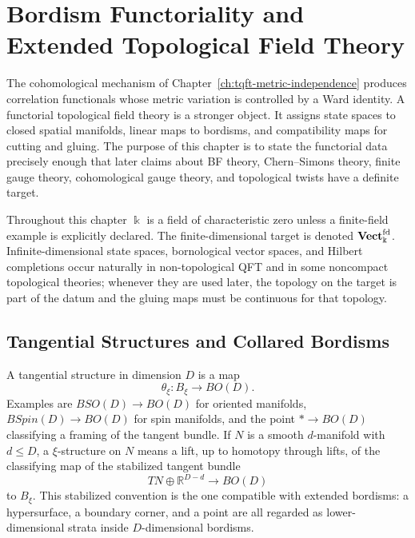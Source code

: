 \chapter{Bordism Functoriality and Extended Topological Field Theory}
\label{ch:tqft-bordism-functoriality-extended}

\ConventionsEuclidean

The cohomological mechanism of
Chapter~\ref{ch:tqft-metric-independence} produces correlation functionals
whose metric variation is controlled by a Ward identity.  A functorial
topological field theory is a stronger object.  It assigns state spaces to
closed spatial manifolds, linear maps to bordisms, and compatibility maps for
cutting and gluing.  The purpose of this chapter is to state the functorial
data precisely enough that later claims about BF theory, Chern--Simons
theory, finite gauge theory, cohomological gauge theory, and topological
twists have a definite target.

Throughout this chapter \(\Bbbk\) is a field of characteristic zero unless a
finite-field example is explicitly declared.  The finite-dimensional target
is denoted \({\bf Vect}^{\rm fd}_{\Bbbk}\).  Infinite-dimensional state
spaces, bornological vector spaces, and Hilbert completions occur naturally in
non-topological QFT and in some noncompact topological theories; whenever
they are used later, the topology on the target is part of the datum and the
gluing maps must be continuous for that topology.

\section{Tangential Structures and Collared Bordisms}

A tangential structure in dimension \(D\) is a map
\[
  \theta_\xi:B_\xi\longrightarrow BO(D).
\]
Examples are \(BSO(D)\to BO(D)\) for oriented manifolds,
\(BSpin(D)\to BO(D)\) for spin manifolds, and the point
\(\ast\to BO(D)\) classifying a framing of the tangent bundle.  If \(N\) is a
smooth \(d\)-manifold with \(d\le D\), a \(\xi\)-structure on \(N\) means a
lift, up to homotopy through lifts, of the classifying map of the stabilized
tangent bundle
\[
  TN\oplus\mathbb R^{D-d}\longrightarrow BO(D)
\]
to \(B_\xi\).  This stabilized convention is the one compatible with
extended bordisms: a hypersurface, a boundary corner, and a point are all
regarded as lower-dimensional strata inside \(D\)-dimensional bordisms.

